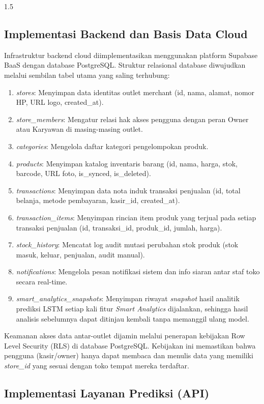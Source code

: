 \documentclass[12pt, a4paper, onecolumn, oneside]{report}
\begin{document}
\begin{spacing}{1.5}
\subsection{Implementasi Backend dan Basis Data Cloud}

Infrastruktur backend cloud diimplementasikan menggunakan platform Supabase BaaS dengan database PostgreSQL. Struktur relasional database diwujudkan melalui sembilan tabel utama yang saling terhubung:
\begin{enumerate}
    \item \textit{stores}: Menyimpan data identitas outlet merchant (id, nama, alamat, nomor HP, URL logo, created\_at).
    \item \textit{store\_members}: Mengatur relasi hak akses pengguna dengan peran Owner atau Karyawan di masing-masing outlet.
    \item \textit{categories}: Mengelola daftar kategori pengelompokan produk.
    \item \textit{products}: Menyimpan katalog inventaris barang (id, nama, harga, stok, barcode, URL foto, is\_synced, is\_deleted).
    \item \textit{transactions}: Menyimpan data nota induk transaksi penjualan (id, total belanja, metode pembayaran, kasir\_id, created\_at).
    \item \textit{transaction\_items}: Menyimpan rincian item produk yang terjual pada setiap transaksi penjualan (id, transaksi\_id, produk\_id, jumlah, harga).
    \item \textit{stock\_history}: Mencatat log audit mutasi perubahan stok produk (stok masuk, keluar, penjualan, audit manual).
    \item \textit{notifications}: Mengelola pesan notifikasi sistem dan info siaran antar staf toko secara real-time.
    \item \textit{smart\_analytics\_snapshots}: Menyimpan riwayat \textit{snapshot} hasil analitik prediksi LSTM setiap kali fitur \textit{Smart Analytics} dijalankan, sehingga hasil analisis sebelumnya dapat ditinjau kembali tanpa memanggil ulang model.
\end{enumerate}

Keamanan akses data antar-outlet dijamin melalui penerapan kebijakan Row Level Security (RLS) di database PostgreSQL. Kebijakan ini memastikan bahwa pengguna (kasir/owner) hanya dapat membaca dan menulis data yang memiliki \textit{store\_id} yang sesuai dengan toko tempat mereka terdaftar.

\subsection{Implementasi Layanan Prediksi (API)}


\end{spacing}
\end{document}

